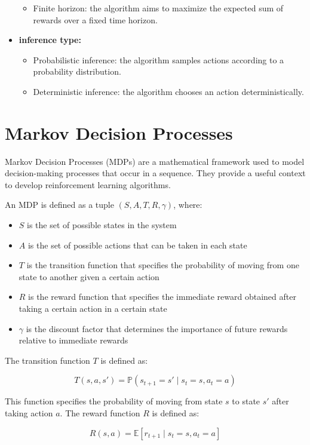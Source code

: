 \begin{minipage}{\textwidth}
\begin{itemize}
\begin{itemize}
    \item Finite horizon: the algorithm aims to maximize the expected sum of rewards over a fixed time horizon.
    \end{itemize}
    \item \textbf{inference type:}
    \begin{itemize}
    \item Probabilistic inference: the algorithm samples actions according to a probability distribution.
    \item Deterministic inference: the algorithm chooses an action deterministically.
    \end{itemize}
    \end{itemize}
\end{minipage}

\section{Markov Decision Processes}
Markov Decision Processes (MDPs) are a mathematical framework used to model decision-making processes that occur in a sequence. They provide a useful 
context to develop reinforcement learning algorithms.

An MDP is defined as a tuple $(S, A, T, R, \gamma)$, where:
\begin{itemize}
    \item $S$ is the set of possible states in the system
    \item $A$ is the set of possible actions that can be taken in each state
    \item $T$ is the transition function that specifies the probability of moving from one state to another given a certain action
    \item $R$ is the reward function that specifies the immediate reward obtained after taking a certain action in a certain state
    \item $\gamma$ is the discount factor that determines the importance of future rewards relative to immediate rewards
\end{itemize}

The transition function $T$ is defined as:

$$T(s, a, s') = \mathbb{P}(s_{t+1}=s' \mid s_t=s, a_t=a)$$

This function specifies the probability of moving from state $s$ to state $s'$ after taking action $a$. The reward function $R$ is defined as:

$$R(s, a) = \mathbb{E}[r_{t+1} \mid s_t=s, a_t=a]$$

